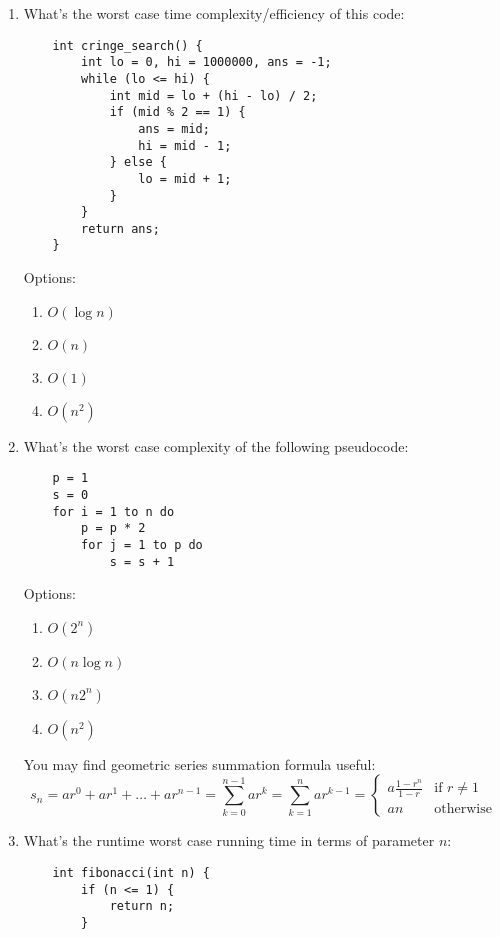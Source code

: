 \documentclass{article}
\begin{document}
\begin{enumerate}
    \item What’s the worst case time complexity/efficiency of this code:
    \begin{lstlisting}
    int cringe_search() {
        int lo = 0, hi = 1000000, ans = -1;
        while (lo <= hi) {
            int mid = lo + (hi - lo) / 2;
            if (mid % 2 == 1) {
                ans = mid;
                hi = mid - 1;
            } else {
                lo = mid + 1;
            }
        }
        return ans;
    }
    \end{lstlisting}
    Options:
    \begin{enumerate}[label=\alph*.]
        \item \( O(\log n) \)
        \item \( O(n) \)
        \item \( O(1) \) \hl{\checkmark}
        \item \( O(n^2) \)
    \end{enumerate}
    
    
    \item What’s the worst case complexity of the following pseudocode:
    \begin{lstlisting}
    p = 1
    s = 0
    for i = 1 to n do
        p = p * 2
        for j = 1 to p do
            s = s + 1
    \end{lstlisting}
    Options:
    \begin{enumerate}[label=\alph*.]
        \item \( O(2^n) \) \hl{\checkmark}
        \item \( O(n \log n) \)
        \item \( O(n 2^n) \)
        \item \( O(n^2) \)
    \end{enumerate}

    You may find geometric series summation formula useful:
    \[
    s_n = a r^0 + ar^1 + \ldots + ar^{n-1} = \sum_{k=0}^{n-1} ar^k = \sum_{k=1}^{n} ar^{k-1} = 
    \begin{cases} 
    a \frac{1-r^n}{1-r} & \text{if } r \neq 1 \\
    an & \text{otherwise}
    \end{cases}
    \]
    
    \newpage
    
    \item What's the runtime worst case running time in terms of parameter \( n \):
    \begin{lstlisting}
    int fibonacci(int n) {
        if (n <= 1) {
            return n;
        }
    

\end{lstlisting}
\end{enumerate}
\end{document}
